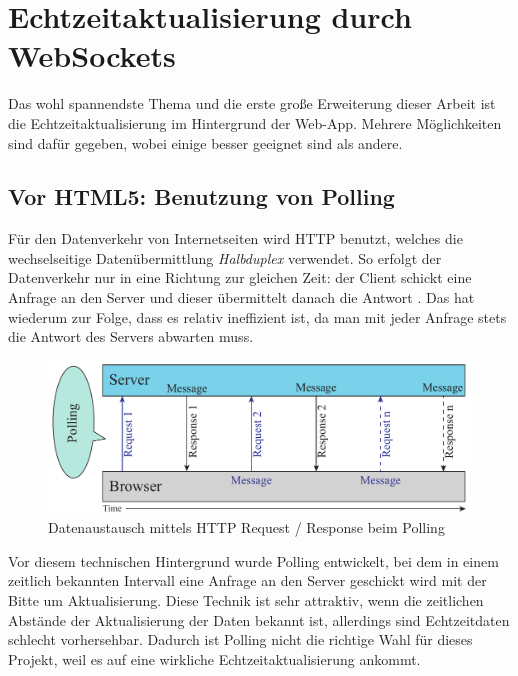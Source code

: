 \chapter{Echtzeitaktualisierung durch WebSockets}
Das wohl spannendste Thema und die erste große Erweiterung dieser Arbeit ist die Echtzeitaktualisierung im Hintergrund der Web-App. Mehrere Möglichkeiten sind dafür gegeben, wobei einige besser geeignet sind als andere.

\section{Vor HTML5: Benutzung von Polling}
Für den Datenverkehr von Internetseiten wird HTTP benutzt, welches die wechselseitige Datenübermittlung \emph{Halbduplex} verwendet. So erfolgt der Datenverkehr nur in eine Richtung zur gleichen Zeit: der Client schickt eine Anfrage an den Server und dieser übermittelt danach die Antwort \cite[S. 5]{ws}. Das hat wiederum zur Folge, dass es relativ ineffizient ist, da man mit jeder Anfrage stets die Antwort des Servers abwarten muss.\par

\begin{figure}[!ht]
	\centering
	\includegraphics[width=15cm]{fig/polling}
	\caption{Datenaustausch mittels HTTP Request / Response beim Polling {\cite[S. 7]{ws}}}
\end{figure}

Vor diesem technischen Hintergrund wurde Polling entwickelt, bei dem in einem zeitlich bekannten Intervall eine Anfrage an den Server geschickt wird mit der Bitte um Aktualisierung. Diese Technik ist sehr attraktiv, wenn die zeitlichen Abstände der Aktualisierung der Daten bekannt ist, allerdings sind Echtzeitdaten schlecht vorhersehbar. Dadurch ist Polling nicht die richtige Wahl für dieses Projekt, weil es auf eine wirkliche Echtzeitaktualisierung ankommt.\par


